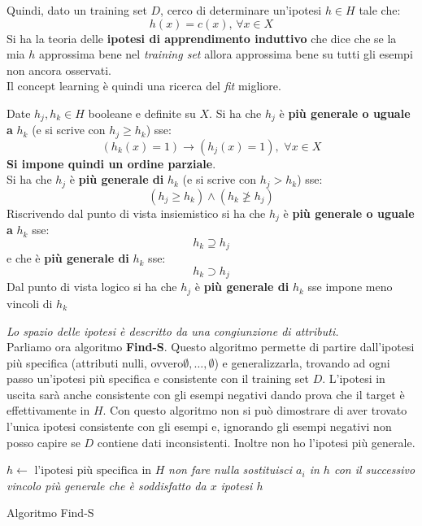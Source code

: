 \documentclass[a4paper,12pt, oneside]{book}
\begin{document}
Quindi, dato un training set $D$, cerco di determinare un'ipotesi $h\in H$ tale
che: 
\[h(x)=c(x),\,\forall x\in X\]
Si ha la teoria delle \textbf{ipotesi di apprendimento induttivo} che dice che
se la mia $h$ approssima bene nel \textit{training set} allora approssima bene
su tutti gli esempi non ancora osservati.\\
Il concept learning è quindi una ricerca del \textit{fit} migliore.
\begin{definizione}
  Date $h_j,h_k\in H$ booleane e definite su $X$. Si ha che $h_j$ è \textbf{più
    generale o uguale a} $h_k$ (e si scrive con $h_j\geq h_k$) sse:
  \[(h_k(x)=1)\longrightarrow (h_j(x)=1),\,\,\forall x\in X\]
  \textbf{Si impone quindi un ordine parziale}.\\
  Si ha che $h_j$ è \textbf{più generale di} $h_k$ (e si scrive con $h_j> h_k$)
  sse:
  \[(h_j\geq h_k)\land (h_k\not\geq h_j)\]
  Riscrivendo dal punto di vista insiemistico si ha che $h_j$ è \textbf{più
    generale o uguale a} $h_k$ sse:
  \[h_k\supseteq h_j\]
  e che è \textbf{più generale di} $h_k$ sse:
  \[h_k\supset h_j\]
  Dal punto di vista logico si ha che $h_j$ è \textbf{più generale di} $h_k$ sse
  impone meno vincoli di $h_k$
\end{definizione}
\textit{Lo spazio delle ipotesi è descritto da una congiunzione di attributi.}\\
Parliamo ora algoritmo \textbf{Find-S}. Questo algoritmo permette di partire
dall'ipotesi più specifica (attributi nulli, ovvero$\emptyset,\ldots,\emptyset$)
e generalizzarla, 
trovando ad ogni passo un'ipotesi più specifica e consistente con il training
set $D$. L'ipotesi in uscita sarà anche consistente con gli esempi negativi
dando prova che il target è effettivamente in $H$. Con questo algoritmo non si
può dimostrare di aver trovato l'unica ipotesi consistente con gli esempi e,
ignorando gli esempi negativi non posso capire se $D$ contiene dati
inconsistenti. Inoltre non ho l'ipotesi più generale.
\begin{algorithm}[H]
  \begin{algorithmic}
    \State $h\gets \mbox{ l'ipotesi più specifica in } H$
    \State \textit{non fare nulla}
    \Else
    \State \textit{sostituisci $a_i$ in $h$ con il successivo vincolo più}
    \State \textit{generale che è soddisfatto da $x$}
    \EndIf
    \EndFor
    \EndFor
    \Return \textit{ipotesi $h$}
    \EndFunction
  \end{algorithmic}
  \caption{Algoritmo Find-S}
\end{algorithm}
\end{document}
